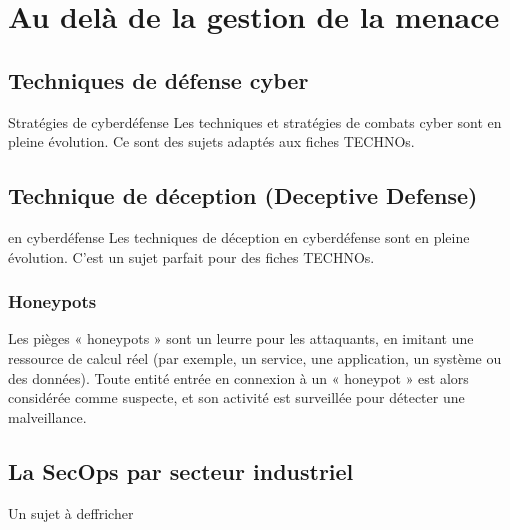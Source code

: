 
\section{Au delà de la gestion de la menace}

\subsection{Techniques de défense cyber}

\begin{warningbox}{Stratégies de cyberdéfense}
Les techniques et stratégies de combats cyber sont en pleine évolution. Ce sont des sujets adaptés aux fiches TECHNOs.
\end{warningbox}

\subsection{Technique de déception (Deceptive Defense)}

\begin{warningbox}{ en cyberdéfense}
Les techniques de déception en cyberdéfense sont en pleine évolution. C'est un sujet parfait pour des fiches TECHNOs.
\end{warningbox}

\subsubsection{Honeypots}

Les pièges « honeypots » sont un leurre pour les attaquants, en imitant une ressource de calcul réel (par exemple, un service, une application, un système ou des données). Toute entité entrée en connexion à un « honeypot » est alors considérée comme suspecte, et son activité est surveillée pour détecter une malveillance.


\subsection{La SecOps par secteur industriel}

Un sujet à deffricher 






